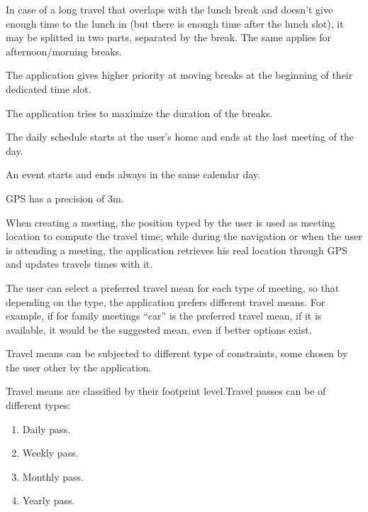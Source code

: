 \begin{list}
\item
In case of a long travel that overlaps with the lunch break and doesn’t give enough time to the lunch in (but there is enough time after the lunch slot), it may be splitted in two parts, separated by the break. The same applies for afternoon/morning breaks.
\item
The application gives higher priority at moving breaks at the beginning of their dedicated time slot.
\item
The application tries to maximize the duration of the breaks.
\item
The daily schedule starts at the user's home and ends at the last meeting of the day.
\item
An event starts and ends always in the same calendar day.
\item
GPS has a precision of 3m.
\item
When creating a meeting, the position typed by the user is used as meeting location to compute the travel time; while during the navigation or when the user is attending a meeting, the application retrieves his real location through GPS and updates travels times with it.
\item
The user can select a preferred travel mean for each type of meeting, so that depending on the type, the application prefers different travel means. For example, if for family meetings “car” is the preferred travel mean, if it is available, it would be the suggested mean, even if better options exist.
\item
Travel means can be subjected to different type of constraints, some chosen by the user other by the application.
\item
Travel means are classified by their footprint level.Travel passes can be of different types:
\begin{enumerate}
\item
Daily pass.
\item
Weekly pass.
\item
Monthly pass.
\item
Yearly pass.
\end{enumerate}


\end{list}
